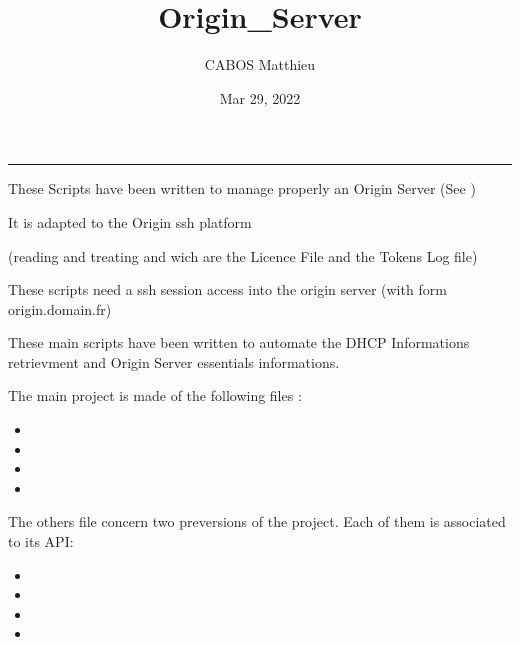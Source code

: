 \documentclass[letterpaper,10pt,english]{sphinxmanual}
\title{Origin\_Server}
\date{Mar 29, 2022}
\author{CABOS Matthieu}
\begin{document}
\pagestyle{empty}
\sphinxmaketitle
\pagestyle{plain}
\sphinxtableofcontents
\pagestyle{normal}
\label{\detokenize{index::doc}}


\sphinxAtStartPar
{} 

\sphinxAtStartPar
{}  

\sphinxAtStartPar
{} 


\bigskip\hrule\bigskip


\sphinxAtStartPar
These Scripts have been written to manage properly an Origin Server (See )

\sphinxAtStartPar
It is adapted to the Origin ssh platform

\sphinxAtStartPar
(reading and treating  and  wich are the Licence File and the Tokens Log file)

\sphinxAtStartPar
These scripts need a ssh session access into the origin server (with form origin.domain.fr)

\sphinxAtStartPar
These main scripts have been written to automate the DHCP Informations retrievment and Origin Server essentials informations.

\sphinxAtStartPar
The main project is made of the following files :
\begin{itemize}
\item {} 
\sphinxAtStartPar
{}

\item {} 
\sphinxAtStartPar
{}

\item {} 
\sphinxAtStartPar
{}

\item {} 
\sphinxAtStartPar
{}

\end{itemize}

\sphinxAtStartPar
The others file concern two pre\sphinxhyphen{}versions of the project. Each of them is associated to its API:
\begin{itemize}
\item {} 
\sphinxAtStartPar
{}

\item {} 
\sphinxAtStartPar
{}

\item {} 
\sphinxAtStartPar
{}

\item {} 
\sphinxAtStartPar
{}

\end{itemize}
\end{document}
